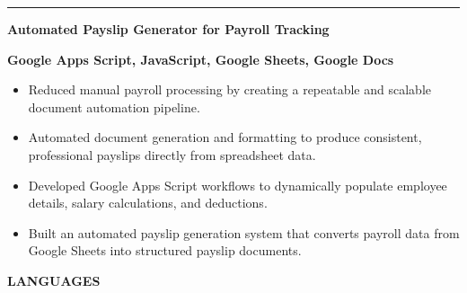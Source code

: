 \documentclass[11pt, a4paper]{article}
\newcommand{\cvsection}[1]{%
  \vspace{6pt}%
  \noindent%
  \colorbox{DKGreen}{\hspace{4pt}\rule{0pt}{14pt}\hspace{4pt}}%
  \colorbox{CardBG}{%
    \parbox[c][14pt]{\dimexpr\linewidth-16pt\relax}{%
      \hspace{8pt}\textcolor{DKGreen}{\textbf{\large\MakeUppercase{#1}}}%
    }%
  }%
  \par
  \noindent{\color{BorderClr}\rule{\linewidth}{0.6pt}}%
  \vspace{4pt}\par\noindent%
}
\begin{document}
\vspace{8pt}
\noindent%
{\color{DKGreen}\rule{4pt}{14pt}}\hspace{6pt}%
\textcolor{DarkTxt}{\textbf{\large Automated Payslip Generator for Payroll Tracking}}\par
\vspace{1pt}
\noindent\hspace{10pt}\textcolor{DKGreen}{\textbf{\small Google Apps Script, JavaScript, Google Sheets, Google Docs}}
\vspace{2pt}
\begin{itemize}
  \item \textcolor{MidTxt}{Reduced manual payroll processing by creating a repeatable and scalable document automation pipeline.}
  \item \textcolor{MidTxt}{Automated document generation and formatting to produce consistent, professional payslips directly from spreadsheet data.}
  \item \textcolor{MidTxt}{Developed Google Apps Script workflows to dynamically populate employee details, salary calculations, and deductions.}
  \item \textcolor{MidTxt}{Built an automated payslip generation system that converts payroll data from Google Sheets into structured payslip documents.}
\end{itemize}
\vspace{2pt}

\newpage

\cvsection{Languages}
\end{document}
